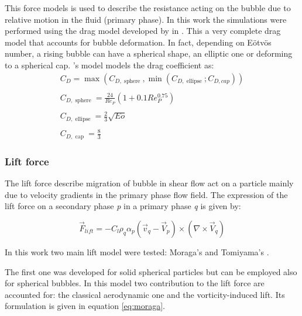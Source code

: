 \documentclass[11pt,a4paper]{article}
\begin{document}
This force models is used to describe the resistance acting on the bubble due to relative motion in the fluid (primary phase). In this work the simulations were performed using the drag model developed by \citeauthor{ishiizuber} in \cite{ishiizuber}. This a very complete drag model that accounts for bubble deformation. In fact, depending on E{ö}tv{ö}s number, a rising bubble can have a spherical shape, an elliptic one or deforming to a spherical cap. \citeauthor{ishiizuber}'s model models the drag coefficient as:
\begin{equation}
\begin{array}{l}
C_{D}=\max \left(C_{D, \text { sphere }}, \min \left(C_{D, \text { ellipse }}; C_{D, c a p}\right)\right) \\ \\
C_{D, \text { sphere }}=\frac{24}{R e_{P}}\left(1+0.1 R e_{P}^{0.75}\right) \\ \\
C_{D, \text { ellipse }}=\frac{2}{3} \sqrt{E o} \\ \\
C_{D, \text { cap }}=\frac{8}{3}
\end{array}
\label{eq:drag}
\end{equation}

\subsubsection{Lift force}
The lift force describe migration of bubble in shear flow act on a particle mainly due to velocity gradients in the primary phase flow field. The expression of the lift force on a secondary phase \textit{p} in a primary phase \textit{q} is given by:

\begin{equation}
\vec{F}_{l i f t}=-C_{l} \rho_{q} \alpha_{p}\left(\vec{v}_{q}-\vec{V}_{p}\right) \times\left(\nabla \times \vec{V}_{q}\right)
\end{equation}


In this work two main lift model were tested: Moraga's \cite{moragalift} and Tomiyama's \cite{tomiyamalift}.

The first one was developed for solid spherical particles but can be employed also for spherical bubbles. In this model two contribution to the lift force are accounted for: the classical aerodynamic one and the vorticity-induced lift. Its formulation is given in equation \ref{eq:moraga}.
\end{document}
